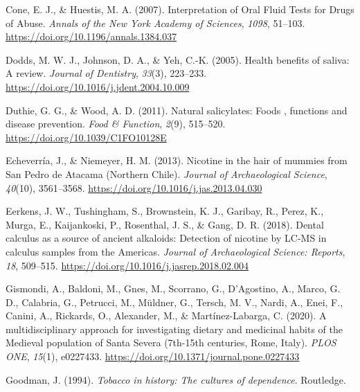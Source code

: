 \documentclass[
  b5paper,
]{book}
\newlength{\cslhangindent}
\newlength{\cslentryspacingunit} %
\newenvironment{CSLReferences}[2] %
 {%
  \setlength{\parindent}{0pt}
  \ifodd #1
  \let\oldpar\par
  \def\par{\hangindent=\cslhangindent\oldpar}
  \fi
  \setlength{\parskip}{#2\cslentryspacingunit}
 }%
 {}
\begin{document}
\begin{CSLReferences}{1}{0}
\leavevmode{}%
Cone, E. J., \& Huestis, M. A. (2007). Interpretation of {Oral Fluid
Tests} for {Drugs} of {Abuse}. \emph{Annals of the New York Academy of
Sciences}, \emph{1098}, 51--103.
\url{https://doi.org/10.1196/annals.1384.037}

\leavevmode{}%
Dodds, M. W. J., Johnson, D. A., \& Yeh, C.-K. (2005). Health benefits
of saliva: A review. \emph{Journal of Dentistry}, \emph{33}(3),
223--233. \url{https://doi.org/10.1016/j.jdent.2004.10.009}

\leavevmode{}%
Duthie, G. G., \& Wood, A. D. (2011). Natural salicylates: Foods ,
functions and disease prevention. \emph{Food \& Function}, \emph{2}(9),
515--520. \url{https://doi.org/10.1039/C1FO10128E}

\leavevmode{}%
Echeverría, J., \& Niemeyer, H. M. (2013). Nicotine in the hair of
mummies from {San Pedro} de {Atacama} ({Northern Chile}). \emph{Journal
of Archaeological Science}, \emph{40}(10), 3561--3568.
\url{https://doi.org/10.1016/j.jas.2013.04.030}

\leavevmode{}%
Eerkens, J. W., Tushingham, S., Brownstein, K. J., Garibay, R., Perez,
K., Murga, E., Kaijankoski, P., Rosenthal, J. S., \& Gang, D. R. (2018).
Dental calculus as a source of ancient alkaloids: {Detection} of
nicotine by {LC-MS} in calculus samples from the {Americas}.
\emph{Journal of Archaeological Science: Reports}, \emph{18}, 509--515.
\url{https://doi.org/10.1016/j.jasrep.2018.02.004}

\leavevmode{}%
Gismondi, A., Baldoni, M., Gnes, M., Scorrano, G., D'Agostino, A.,
Marco, G. D., Calabria, G., Petrucci, M., Müldner, G., Tersch, M. V.,
Nardi, A., Enei, F., Canini, A., Rickards, O., Alexander, M., \&
Martínez-Labarga, C. (2020). A multidisciplinary approach for
investigating dietary and medicinal habits of the {Medieval} population
of {Santa Severa} (7th-15th centuries, {Rome}, {Italy}). \emph{PLOS
ONE}, \emph{15}(1), e0227433.
\url{https://doi.org/10.1371/journal.pone.0227433}

\leavevmode{}%
Goodman, J. (1994). \emph{Tobacco in history: The cultures of
dependence}. {Routledge}.


\end{CSLReferences}
\end{document}
